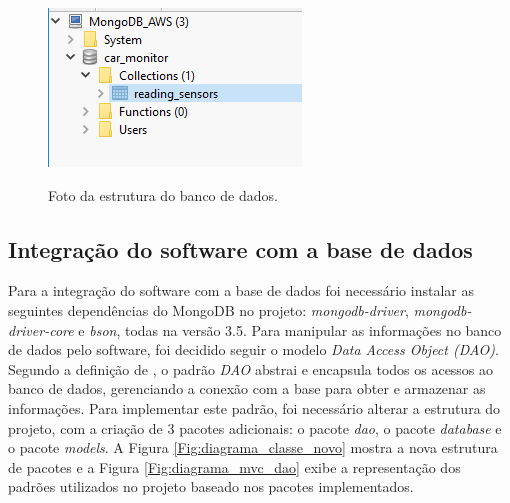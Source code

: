 \begin{figure}[!ht]
\centering
\caption{Foto da estrutura do banco de dados.} 
{\includegraphics[scale=1.5]{imagens/baseDadosBanco.png}}\\
 \label{Fig:base_dados}
\end{figure}

\subsection{\textbf{Integração do software com a base de dados}}
Para a integração do software com a base de dados foi necessário instalar as seguintes dependências do MongoDB no projeto: \textit{mongodb-driver}, \textit{mongodb-driver-core} e \textit{bson}, todas na versão 3.5. Para manipular as informações no banco de dados pelo software, foi decidido seguir o modelo \textit{Data Access Object (DAO)}. Segundo a definição de , o padrão \textit{DAO} abstrai e encapsula todos os acessos ao banco de dados, gerenciando a conexão com a base para obter e armazenar as informações. Para implementar este padrão, foi necessário alterar a estrutura do projeto, com a criação de 3 pacotes adicionais: o pacote \textit{dao}, o pacote \textit{database} e o pacote \textit{models}. A Figura \ref{Fig:diagrama_classe_novo} mostra a nova estrutura de pacotes e a Figura \ref{Fig:diagrama_mvc_dao} exibe a representação dos padrões utilizados no projeto baseado nos pacotes implementados.

